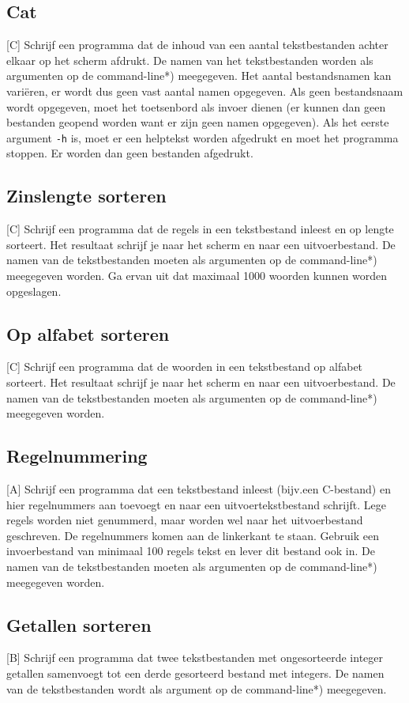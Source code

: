 \documentclass[a4paper,10pt,fleqn,twoside]{article}
\begin{document}
\subsection{Cat}[C]
Schrijf een programma dat de inhoud van een aantal tekstbestanden achter elkaar op het scherm afdrukt. De namen van het tekstbestanden worden als argumenten op de command-line*) meegegeven. Het aantal bestandsnamen kan variëren, er wordt dus geen vast aantal namen opgegeven. Als geen bestandsnaam wordt opgegeven, moet het toetsenbord als invoer dienen (er kunnen dan geen bestanden geopend worden want er zijn geen namen opgegeven). Als het eerste argument \lstinline|-h| is, moet
er een helptekst worden afgedrukt en moet het programma stoppen. Er worden dan geen bestanden afgedrukt.

\subsection{Zinslengte sorteren}[C]
Schrijf een programma dat de regels in een tekstbestand inleest en op lengte sorteert. Het resultaat schrijf je naar het scherm en naar een uitvoerbestand. De namen van de tekstbestanden moeten als argumenten op de command-line*) meegegeven worden. Ga ervan uit dat maximaal 1000 woorden kunnen worden opgeslagen.

\subsection{Op alfabet sorteren}[C]
Schrijf een programma dat de woorden in een tekstbestand op alfabet sorteert. Het resultaat schrijf je naar het scherm en naar een uitvoerbestand. De namen van de tekstbestanden moeten als argumenten op de command-line*) meegegeven worden.

\subsection{Regelnummering}[A]
Schrijf een programma dat een tekstbestand inleest (bijv.\@ een C-bestand) en hier regelnummers aan toevoegt en naar een uitvoertekstbestand schrijft. Lege regels worden niet genummerd, maar worden wel naar het uitvoerbestand geschreven. De regelnummers komen aan de linkerkant te staan. Gebruik een invoerbestand van minimaal 100 regels tekst en lever dit bestand ook in. De namen van de tekstbestanden moeten als argumenten op de command-line*) meegegeven worden.

\subsection{Getallen sorteren}[B]
Schrijf een programma dat twee tekstbestanden met ongesorteerde integer getallen samenvoegt tot een derde gesorteerd bestand met integers. De namen van de tekstbestanden wordt als argument op de command-line*) meegegeven.
\end{document}

